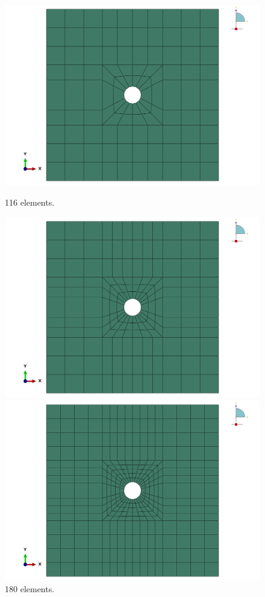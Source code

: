 \documentclass[12pt]{article}
\begin{document}
\begin{figure}[H]
    \centering
    \begin{minipage}{0.24\textwidth}
        \centering
        \includegraphics[width=\textwidth]{images/Mesh1.png}
        \caption*{116 elements.}
    \end{minipage}
    \begin{minipage}{0.24\textwidth}
        \centering
        \includegraphics[width=\textwidth]{images/Mesh2.png}
        \caption*{180 elements.}
    \end{minipage}
    \begin{minipage}{0.24\textwidth}
        \centering
        \includegraphics[width=\textwidth]{images/Mesh3.png}

\end{minipage}
\end{figure}
\end{document}
